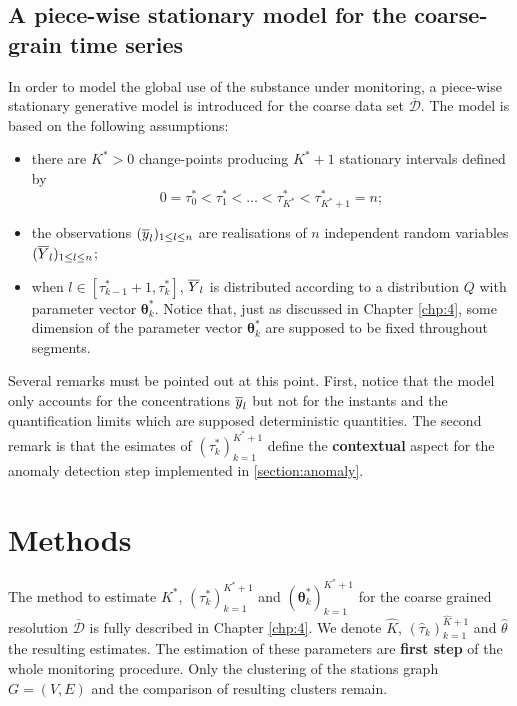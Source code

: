 \subsection{A piece-wise stationary model for the coarse-grain time series}\label{subsection:pwsm}

In order to model the global use of the substance under monitoring, a piece-wise stationary generative model is introduced for the coarse data set $\overline{\mathcal{D}}$. The model is based on the following assumptions:
\begin{itemize}
    \item there are $K^*>0$ change-points producing $K^*+1$ stationary intervals defined by
\begin{equation*}
0=\tau_0^*<\tau_1^*<\ldots<\tau_{K^*}^*<\tau^*_{K^*+1}=n;    
\end{equation*}    
    \item the observations $(\overline{y}_l)_{1\leq l\leq n}$ are realisations of $n$ independent random variables $(\overline{Y}_l)_{1\leq l\leq n}$;
    \item when $l\in [\tau^*_{k-1}+1, \tau^*_{k}]$, $\overline{Y}_l$ is distributed according to a distribution $Q$ with parameter vector $\bm\theta^*_k$. Notice that, just as discussed in Chapter \ref{chp:4}, some dimension of the parameter vector $\bm\theta^*_k$ are supposed to be fixed throughout segments. 
\end{itemize}
Several remarks must be pointed out at this point. First, notice that the model only accounts for the concentrations $\overline{y}_l$ but not for the instants and the quantification limits which are supposed deterministic quantities. The second remark is that the esimates of $(\tau^*_k)_{k=1}^{K^*+1}$ define the \textbf{contextual} aspect for the anomaly detection step implemented in \ref{section:anomaly}.  

\section{Methods}\label{section:methods}

The method to estimate $K^*$, $(\tau^*_k)_{k=1}^{K^*+1}$ and $(\bm\theta^*_k)_{k=1}^{K^*+1}$ for the coarse grained resolution $\overline{\mathcal{D}}$ is fully described in Chapter \ref{chp:4}. We denote $\widehat{K}$, $(\widehat{\tau}_k)_{k=1}^{\widehat{K}+1}$ and $\widehat{\theta}$ the resulting estimates. The estimation of these parameters are \textbf{first step} of the whole monitoring procedure. Only the clustering of the stations graph $G = (V,E)$ and the comparison of resulting clusters remain.  

